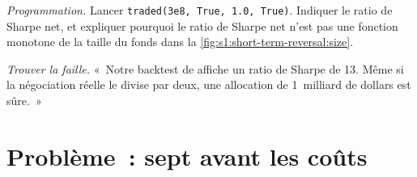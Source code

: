 \begin{exercise}[$\star\star\star$]\label{exo:s1:short-term-reversal:7}
\emph{Programmation.} Lancer \texttt{traded(3e8, True, 1.0, True)}. Indiquer le ratio de Sharpe net, et expliquer pourquoi le ratio de Sharpe net n'est pas une fonction monotone de la taille du
fonds dans la \cref{fig:s1:short-term-reversal:size}.
\end{exercise}

\begin{exercise}[$\star\star\star$]\label{exo:s1:short-term-reversal:8}
\emph{Trouver la faille.} «~Notre backtest de  affiche un ratio de Sharpe de 13. Même si la négociation réelle le divise par deux, une allocation de 1~milliard de dollars est sûre.~»
\end{exercise}

\section{Problème~: sept avant les coûts}

